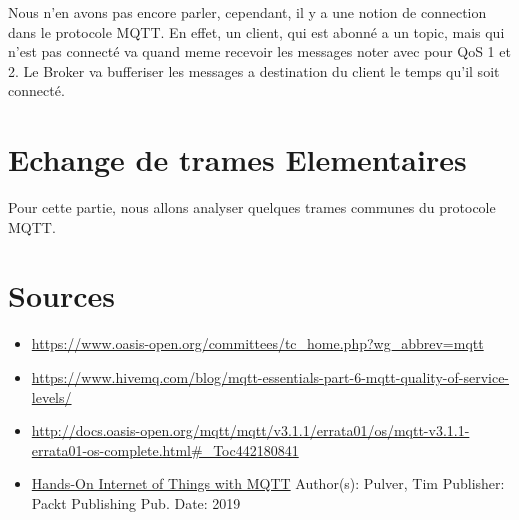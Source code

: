 \documentclass[a4paper,10pt]{article}
\begin{document}
Nous n'en avons pas encore parler, cependant, il y a une notion de connection dans le protocole MQTT. En effet, un client, qui est abonné a un topic, mais qui n'est pas connecté va quand meme recevoir les messages noter avec pour QoS 1 et 2. Le Broker va bufferiser les messages a destination du client le temps qu'il soit connecté.


\section{Echange de trames Elementaires}

Pour cette partie, nous allons analyser quelques trames  communes du protocole MQTT.





 \section{Sources}

\begin{itemize}
 \item \url{https://www.oasis-open.org/committees/tc_home.php?wg_abbrev=mqtt}
 \item \url{https://www.hivemq.com/blog/mqtt-essentials-part-6-mqtt-quality-of-service-levels/}
 \item \url{http://docs.oasis-open.org/mqtt/mqtt/v3.1.1/errata01/os/mqtt-v3.1.1-errata01-os-complete.html#_Toc442180841}
 \item \underline{Hands-On Internet of Things with MQTT} Author(s): Pulver, Tim Publisher: Packt Publishing Pub. Date: 2019
\end{itemize}
\end{document}
